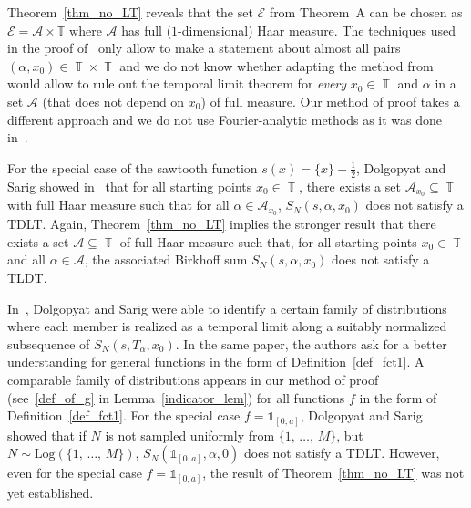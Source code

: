 \documentclass[AHL,Unicode,longabstracts,published]{cedram}
\DeclareMathOperator{\T}{\mathbb{T}}
\newcommand{\bbT}{\mathbb{T}}
\newcommand{\clE}{\mathcal{E}}
\newcommand{\clA}{\mathcal{A}}
\newcommand{\bbT}{\mathbb{T}}
\begin{document}
\begin{rema*}
Theorem~\ref{thm_no_LT} reveals that the set $\clE$ from Theorem~A can be chosen as $\clE = \clA \times \bbT$ where $\clA$ has full ($1$-dimensional) Haar measure. The techniques used in the proof of~\cite[Theorem~A]{dol_sar_no} only allow to make a statement about almost all pairs $(\alpha,x_0) \in \T \times \T$ and we do not know whether adapting the method from~\cite{dol_sar_no} would allow to rule out the temporal limit theorem for \emph{every} $x_0 \in \T$ and $\alpha$ in a set $\clA$ (that does not depend on $x_0$) of full measure. Our method of proof takes a different approach and we do not use Fourier-analytic methods as it was done in~\cite{dol_sar_no,quenched}.
\end{rema*}


For the special case of the sawtooth function $s(x) = \{x\}-\frac{1}{2}$, Dolgopyat and Sarig showed in~\cite[Corollary~2.3]{quenched} that for all starting points $x_0 \in \T$, there exists a set $\clA_{x_0} \subseteq \T $ with full Haar measure such that for all $\alpha \in \clA_{x_0}$, $S_N(s,\alpha, x_0)$ does not satisfy a TDLT. Again, Theorem~\ref{thm_no_LT} implies the stronger result that there exists a set $\clA \subseteq \T $ of full Haar-measure such that, for all starting points $x_0 \in \T$ and all $\alpha \in \clA$, the associated Birkhoff sum $S_N(s, \alpha, x_0)$ does not satisfy a TLDT.

In~\cite[Corollary~2.3]{quenched}, Dolgopyat and Sarig were able to identify a certain family of distributions where each member is realized as a temporal limit along a suitably normalized subsequence of $S_N(s,T_{\alpha},x_0)$. In the same paper, the authors ask for a better understanding for general functions in the form of Definition~\ref{def_fct1}. A comparable family of distributions appears in our method of proof (see~\eqref{def_of_g} in Lemma~\ref{indicator_lem}) for all functions $f$ in the form of Definition~\ref{def_fct1}. For the special case $f = \mathds{1}_{[0,a]}$, Dolgopyat and Sarig~\cite{dol_sar} showed that if $N$ is not sampled uniformly from $\{1,\,\ldots,\,M\}$, but $N \sim \text{Log}(\{1,\,\ldots,\,M\})$, $S_N(\mathds{1}_{[0,a]},\alpha,0)$ does not satisfy a TDLT. However, even for the special case $f = \mathds{1}_{[0,a]}$, the result of Theorem~\ref{thm_no_LT} was not yet established.
\end{document}
